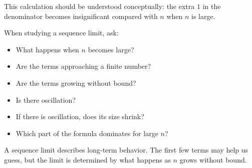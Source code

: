 This calculation should be understood conceptually: the extra \(1\) in the denominator becomes insignificant compared with \(n\) when \(n\) is large.

\begin{summarybox}
When studying a sequence limit, ask:
\begin{itemize}
\item What happens when \(n\) becomes large?
\item Are the terms approaching a finite number?
\item Are the terms growing without bound?
\item Is there oscillation?
\item If there is oscillation, does its size shrink?
\item Which part of the formula dominates for large \(n\)?
\end{itemize}
\end{summarybox}

A sequence limit describes long-term behavior. The first few terms may help us guess, but the limit is determined by what happens as \(n\) grows without bound.